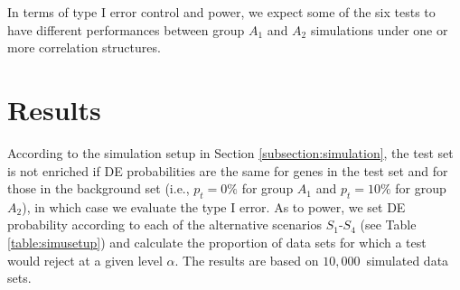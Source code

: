 \documentclass[a4,center,fleqn]{NAR}
\newcommand{\HowmanyTest}{six}
\newcommand{\CMR}{CAMERA-rank}
\newcommand{\CMT}{CAMERA-modt}
\newcommand{\gent}{SigPathway}
\newcommand{\HowmanySimu}{$10,000$}
\begin{document}
	
	
	In terms of type I error control and power, we expect some of the six tests to have different
	performances between group $A_1$ and $A_2$ simulations under one or more correlation structures. 
	
	
	\section{Results}\label{section:results}
	
	According to the simulation setup in Section \ref{subsection:simulation}, the test set is not
	enriched if DE probabilities are the same for genes in the test set and for those in the background
	set (i.e., $p_t =0\%$ for group $A_1$ and $p_t = 10\%$ for group $A_2$), in which case we evaluate
	the type I error. As to power, we set DE probability according to each of the alternative scenarios
	$S_1$-$S_4$ (see Table \ref{table:simusetup}) and calculate the proportion of data sets for which a
	test would reject at a given level $\alpha$. The results are based on \HowmanySimu~simulated data
	sets. 
	
\end{document}
